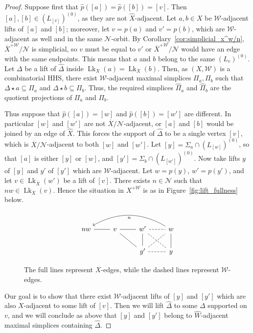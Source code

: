 \documentclass[svgnames]{amsart}
\theoremstyle{plain}
\theoremstyle{definition}
\newcommand{\ov}[1]{\overline{#1}}
\newcommand{\link}{\operatorname{Lk}}
\newcommand{\N}{\mathcal{N}}
\newcommand{\W}{\mathcal{W}}
\newcommand{\h}{\widehat}
\begin{document}
\begin{proof}
Suppose first that $\h p([a])=\h p([b])=[v]$. Then $[a],[b]\in (L_{[v]})^{(0)}$, as they are not $\h X$-adjacent. Let $a,b\in X$ be $\W$-adjacent lifts of $[a]$ and $[b]$; moreover, let $v=p(a)$ and $v'=p(b)$, which are $\W$-adjacent as well and in the same $\N$-orbit. By Corollary~\ref{cor:simplicial_x^w/n}, $\ov X^{+\W}/\N$ is simplicial, so $v$ must be equal to $v'$ or $\ov X^{+\W}/\N$ would have an edge with the same endpoints. This means that $a$ and $b$ belong to the same $(L_{v})^{(0)}$. Let $\Delta$ be a lift of $\h\Delta$ inside $\link_X(a)=\link_X(b)$. Then, as $(X,\W)$ is a combinatorial HHS, there exist $\W$-adjacent maximal simplices $\Pi_a, \Pi_b$ such that $\Delta\star a\subseteq\Pi_a$ and $\Delta\star b\subseteq\Pi_b$. Thus, the required simplices $\h\Pi_a$ and $\h\Pi_b$ are the quotient projections of $\Pi_a$ and $\Pi_b$.
\par\medskip
Thus suppose that $\h p([a])=[w]$ and $\h p([b])=[w']$ are different. In particular $[w]$ and $[w']$ are not $\ov{X}/\N$-adjacent, or $[a]$ and $[b]$ would be joined by an edge of $\h X$. This forces the support of $\h\Delta$ to be a single vertex $[v]$, which is $\ov X/\N$-adjacent to both $[w]$ and $[w']$. Let $[y]=\Sigma_a\cap (L_{[w]})^{(0)}$, so that $[a]$ is either $[y]$ or $[w]$, and $[y']=\Sigma_b\cap (L_{[w']})^{(0)}$. Now take lifts $y$ of $[y]$ and $y'$ of $[y']$ which are $\W$-adjacent. Let $w=p(y)$, $w'=p(y')$, and let $v\in \link_{\ov X}(w')$ be a lift of $[v]$. There exists $n\in \N$ such that $nw\in\link_{\ov X}(v)$. Hence the situation in $X^{+\W}$ is as in Figure~\eqref{fig:lift_fullness} below.

\begin{figure}[htp]
    \centering
    $$\begin{tikzcd}
        nw\ar[r,no head]& v\ar[r,no head]\ar[rd,no head]& w'\ar[r,no head, dashed]\ar[d, no head]\ar[rd,no head, dashed]& w\ar[d, no head]  \ar[lll, bend right, "n"]  \\
        & & y'\ar[r,no head, dashed]\ar[ru,no head, dashed]& y 
    \end{tikzcd}$$
    \caption{The full lines represent $X$-edges, while the dashed lines represent $\W$-edges.}
    \label{fig:lift_fullness}
\end{figure}

Our goal is to show that there exist $\W$-adjacent lifts of $[y]$ and $[y']$ which are also $X$-adjacent to some lift of $[v]$. Then we will lift $\h \Delta$ to some $\Delta$ supported on $v$, and we will conclude as above that $[y]$ and $[y']$ belong to $\h W$-adjacent maximal simplices containing $\h \Delta$.


\end{proof}
\end{document}
